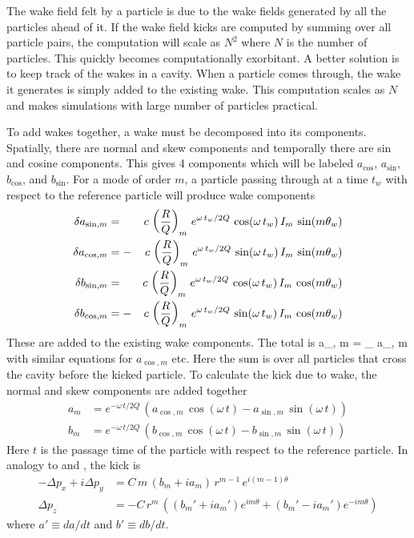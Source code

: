 The wake field felt by a particle is due to the wake fields generated by
all the particles ahead of it. If the wake field kicks are computed by
summing over all particle pairs, the
computation will scale as $N^2$ where $N$ is the number of
particles. This quickly becomes computationally exorbitant. A better
solution is to keep track of the wakes in a cavity. When a particle
comes through, the wake it generates is simply added to the existing
wake. This computation scales as $N$ and makes simulations with large
number of particles practical. 

To add wakes together, a wake must be decomposed into its
components.  Spatially, there are normal and skew components and
temporally there are sin and cosine components. This gives 4
components which will be labeled $a_{\cos}$, $a_{\sin}$, $b_{\cos}$,
and $b_{\sin}$. For a mode of order $m$, a particle passing through at
a time $t_w$ with respect to the reference particle will produce
wake components
\begin{alignat}{2}
  \delta a_{\sin, m} &=  &c \, \left( \frac{R}{Q} \right)_m \,
    e^{\omega \, t_w/ 2 Q} \, \cos (\omega \, t_w) \, I_m \, \sin(m \theta_w) 
    \nonumber \\
  \delta a_{\cos, m} &= -&c \, \left( \frac{R}{Q} \right)_m \,
    e^{\omega \, t_w/ 2 Q} \, \sin (\omega \, t_w) \, I_m \, \sin(m \theta_w) 
    \label{ac2rq} 
    \\
  \delta b_{\sin, m} &=  &c \, \left( \frac{R}{Q} \right)_m \,
    e^{\omega \, t_w/ 2 Q} \, \cos (\omega \, t_w) \, I_m \, \cos(m \theta_w) 
    \nonumber \\
  \delta b_{\cos, m} &= -&c \, \left( \frac{R}{Q} \right)_m \,
    e^{\omega \, t_w/ 2 Q} \, \sin (\omega \, t_w) \, I_m \, \cos(m \theta_w) 
    \nonumber
\end{alignat}
These are added to the existing wake components. The total is
\Begineq
  a_{\sin, m} = \sum_{} \delta a_{\sin, m}
\Endeq
with similar equations for $a_{\cos, m}$ etc. Here the sum is over all particles
that cross the cavity before the kicked particle. To calculate the kick
due to wake, the normal and skew components are added together
\begin{align}
  a_m &= e^{-\omega \, t/ 2 Q} \, \left( 
    a_{\cos, m} \, \cos (\omega \, t) - a_{\sin, m} \, \sin (\omega \, t) \right) 
    \label{akz2q} \\
  b_m &= e^{-\omega \, t/ 2 Q} \, \left(
    b_{\cos, m} \, \cos (\omega \, t) - b_{\sin, m} \, \sin (\omega \, t) \right) \nonumber 
\end{align}
Here $t$ is the passage time of the particle with respect to the
reference particle. In analogy to  and , the kick
is
\begin{align}
  -\Delta p_x + i\Delta p_y &= C \, 
    m \, (b_m + i a_m) \, r^{m-1} \, e^{i (m-1) \theta} 
    \label{ppcmbar} \\
  \Delta p_z &= -C \, r^m \, \left( 
    (b_m' + i a_m') e^{i m\theta} + (b_m' - i a_m') e^{-i m\theta} \right)
\end{align}
where $a' \equiv da/dt$ and $b' \equiv db/dt$.

